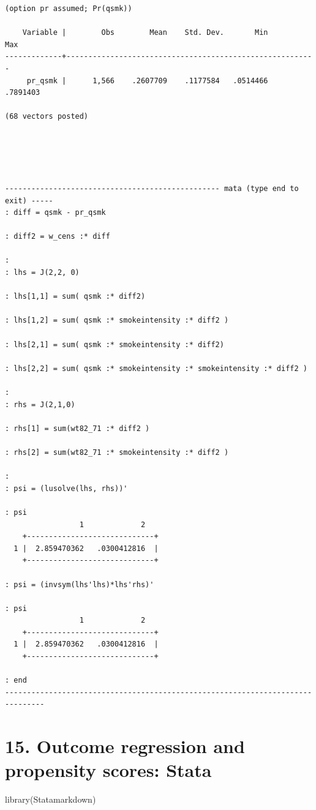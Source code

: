 \documentclass[
  10pt,
]{book}
\newenvironment{Shaded}{\begin{snugshade}}{\end{snugshade}}
\newcommand{\FunctionTok}[1]{\textcolor[rgb]{0.00,0.00,0.00}{#1}}
\newcommand{\NormalTok}[1]{#1}
\begin{document}
\begin{verbatim}
(option pr assumed; Pr(qsmk))

    Variable |        Obs        Mean    Std. Dev.       Min        Max
-------------+---------------------------------------------------------
     pr_qsmk |      1,566    .2607709    .1177584   .0514466   .7891403

(68 vectors posted)





------------------------------------------------- mata (type end to exit) -----
: diff = qsmk - pr_qsmk

: diff2 = w_cens :* diff

: 
: lhs = J(2,2, 0)

: lhs[1,1] = sum( qsmk :* diff2)

: lhs[1,2] = sum( qsmk :* smokeintensity :* diff2 )

: lhs[2,1] = sum( qsmk :* smokeintensity :* diff2)

: lhs[2,2] = sum( qsmk :* smokeintensity :* smokeintensity :* diff2 )

:                                                                 
: rhs = J(2,1,0)

: rhs[1] = sum(wt82_71 :* diff2 )

: rhs[2] = sum(wt82_71 :* smokeintensity :* diff2 )

: 
: psi = (lusolve(lhs, rhs))'

: psi
                 1             2
    +-----------------------------+
  1 |  2.859470362   .0300412816  |
    +-----------------------------+

: psi = (invsym(lhs'lhs)*lhs'rhs)'

: psi
                 1             2
    +-----------------------------+
  1 |  2.859470362   .0300412816  |
    +-----------------------------+

: end
-------------------------------------------------------------------------------
\end{verbatim}

\hypertarget{outcome-regression-and-propensity-scores-stata}{%
\chapter*{15. Outcome regression and propensity scores: Stata}\label{outcome-regression-and-propensity-scores-stata}}

\begin{Shaded}
\begin{Highlighting}[]
\FunctionTok{library}\NormalTok{(Statamarkdown)}
\end{Highlighting}
\end{Shaded}
\end{document}
